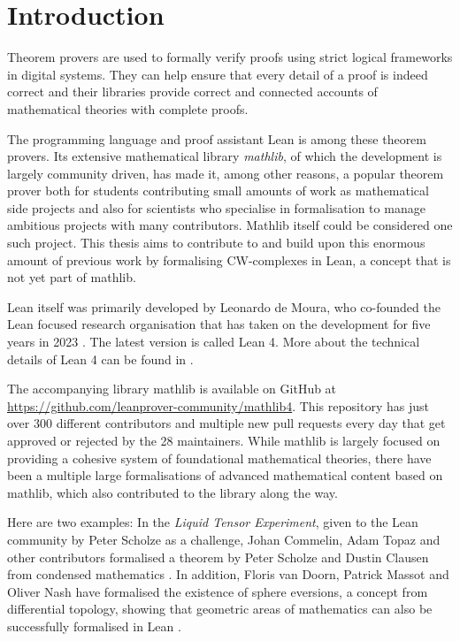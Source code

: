\chapter*{Introduction}


Theorem provers are used to formally verify proofs using strict logical frameworks in digital systems. 
They can help ensure that every detail of a proof is indeed correct and their libraries provide correct and connected accounts of mathematical theories with complete proofs.

The programming language and proof assistant Lean is among these theorem provers.
Its extensive mathematical library \emph{mathlib}, of which the development is largely community driven, has made it, among other reasons, a popular theorem prover both for students contributing small amounts of work as mathematical side projects and also for scientists who specialise in formalisation to manage ambitious projects with many contributors. 
Mathlib itself could be considered one such project. 
This thesis aims to contribute to and build upon this enormous amount of previous work by formalising CW-complexes in Lean, a concept that is not yet part of mathlib.

Lean itself was primarily developed by Leonardo de Moura, who co-founded the Lean focused research organisation that has taken on the development for five years in 2023 \cite{LeanFRO2024}. 
The latest version is called Lean 4.
More about the technical details of Lean 4 can be found in \cite{deMoura2021}.

The accompanying library mathlib is available on GitHub at \url{https://github.com/leanprover-community/mathlib4}. 
This repository has just over 300 different contributors and multiple new pull requests every day that get approved or rejected by the 28 maintainers.
While mathlib is largely focused on providing a cohesive system of foundational mathematical theories, there have been a multiple large formalisations of advanced mathematical content based on mathlib, which also contributed to the library along the way. 

Here are two examples: 
In the \emph{Liquid Tensor Experiment}, given to the Lean community by Peter Scholze as a challenge, Johan Commelin, Adam Topaz and other contributors formalised a theorem by Peter Scholze and Dustin Clausen from condensed mathematics \cite{Commelin2022}.
In addition, Floris van Doorn, Patrick Massot and Oliver Nash have formalised the existence of sphere eversions, a concept from differential topology, showing that geometric areas of mathematics can also be successfully formalised in Lean \cite{vanDoorn2023}. 

